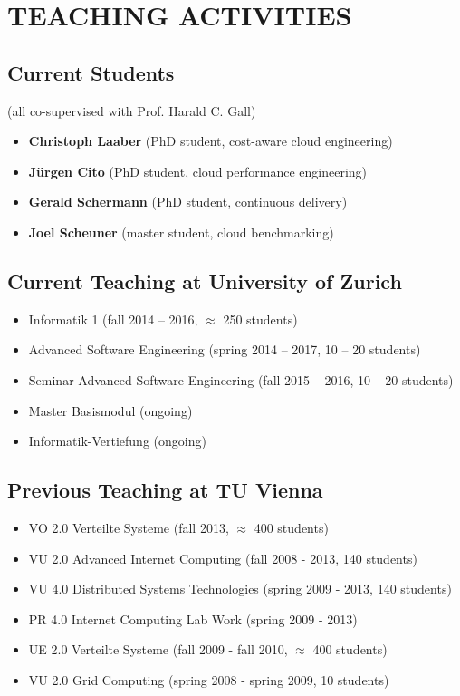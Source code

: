 \documentclass[paper=letter,fontsize=11pt]{scrartcl} %
\newcommand{\NewPart}[2]{\section*{\uppercase{#1} #2}}
\begin{document}
\NewPart{Teaching Activities}{}

  \subsection*{Current Students}
  (all co-supervised with Prof. Harald C. Gall)

\begin{itemize}
\item \textbf{Christoph Laaber} (PhD student, cost-aware cloud engineering)
\item \textbf{J\"urgen Cito} (PhD student, cloud performance engineering)
\item \textbf{Gerald Schermann} (PhD student, continuous delivery)
\item \textbf{Joel Scheuner}  (master student, cloud benchmarking)
\end{itemize}

\subsection*{Current Teaching at University of Zurich}
\begin{itemize}
  \item Informatik 1 (fall 2014 -- 2016, $\approx$ 250 students)
  \item Advanced Software Engineering (spring 2014 -- 2017, 10 -- 20 students)
  \item Seminar Advanced Software Engineering (fall 2015 -- 2016, 10 -- 20 students)
  \item Master Basismodul (ongoing)
  \item Informatik-Vertiefung (ongoing)
\end{itemize}

\subsection*{Previous Teaching at TU Vienna}
\begin{itemize}
  \item VO 2.0 Verteilte Systeme (fall 2013, $\approx$ 400  students)
  \item VU 2.0 Advanced Internet Computing (fall 2008 - 2013, 140 students)
  \item VU 4.0 Distributed Systems Technologies (spring 2009 - 2013, 140 students)
  \item PR 4.0 Internet Computing Lab Work (spring 2009 - 2013)
  \item UE 2.0 Verteilte Systeme (fall 2009 - fall 2010, $\approx$ 400 students)
  \item VU 2.0 Grid Computing (spring 2008 - spring 2009, 10 students)
\end{itemize}
\end{document}
